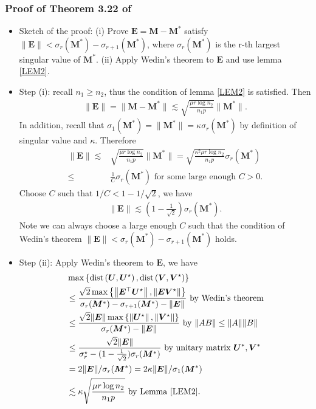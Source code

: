 \documentclass[override]{beamer} %
\newcommand{\bi}{\begin{itemize} \scriptsize} \newcommand{\ei}{\end{itemize}}
\theoremstyle{remark}
\newcommand{\bs}[1]{{\boldsymbol{#1}^*}}
\newcommand{\bb}[1]{{\boldsymbol {#1}}}
\begin{document}
\begin{frame}
\frametitle{Proof of Theorem 3.22 of \cite{Chen:2021}}
\bi
\item 
Sketch of the proof: 
(i) Prove $\bb E = \bb M - \bs M$ satisfy $\|\bb E\| < \sigma_r(\bs M) - \sigma_{r+1}(\bs M)$, where $\sigma_r(\bs M)$ is the r-th largest singular value of $\bs M$. (ii) Apply Wedin's theorem to $\bb E$ and use lemma \ref{LEM2}.
\item
Step (i): recall $n_1 \geq n_2$, thus the condition of lemma \ref{LEM2} is satisfied. Then 
\begin{align*}
    \|\bb E\| = \|\bb M  - \bs M\| 
    \lesssim \sqrt{\frac{\mu r \log n_2}{n_1 p }} \|\bs M\|.
\end{align*}
In addition, recall that $\sigma_1(\bs M) = \|\bs M\| = \kappa \sigma_r(\bs M)$ by definition of singular value and $\kappa$.
Therefore 
\begin{align*}
    \|\bb E\| 
    \lesssim & \sqrt{\frac{\mu r \log n_2}{n_1 p }} \|\bs M\|
    = \sqrt{\frac{ \kappa^2 \mu r \log n_2}{n_1 p }} \sigma_r(\bs M) \\
    \leq & \frac{1}{C} \sigma_r(\bs M) \text{ for some large enough $C>0$}.
\end{align*}
Choose $C$ such that $1/C < 1-1/\sqrt{2}$, we have 
\begin{align*}
    \|\bb E\| 
    \lesssim 
    (1-\frac{1}{\sqrt{2}}) \sigma_r(\bs M).
\end{align*}
Note we can always choose a large enough $C$ such that the condition of Wedin's theorem $\|\bb E\| < \sigma_r(\bs M) - \sigma_{r+1}(\bs M) $ holds.

\item
Step (ii): Apply Wedin's theorem to $\bb E$, we have 
\begin{align*}
& \max \left\{\operatorname{dist}\left(\boldsymbol{U}, \boldsymbol{U}^{\star}\right), \operatorname{dist}\left(\boldsymbol{V}, \boldsymbol{V}^{\star}\right)\right\} \\
& \leq \frac{\sqrt{2} \max \left\{\left\|\boldsymbol{E}^{\top} \boldsymbol{U}^{\star}\right\|,\left\|\boldsymbol{E} \boldsymbol{V}^{\star}\right\|\right\}}{\sigma_r(\bs M)-\sigma_{r+1}(\bs M)-\|\boldsymbol{E}\|} \text{ by  Wedin's theorem}\\
&  \leq \frac{\sqrt{2} \|\bb E\| \max \left\{\left\|\boldsymbol{U}^{\star}\right\|,\left\|\boldsymbol{V}^{\star}\right\|\right\}}{\sigma_r(\bs M)-\|\boldsymbol{E}\|} \text{ by } \|AB\|\leq \|A\|\|B\|\\
& \leq \frac{\sqrt{2} \|\bb E\|}{\sigma_r^{\star}-(1-\frac{1}{\sqrt{2}})\sigma_r(\bs M)} \text{ by unitary matrix $\bs U, \bs V$}\\
& = 2 \|\bb E\| / \sigma_r(\bs M) 
= 2\kappa \|\bb E\| /\sigma_1(\bs M)\\
& \lesssim \kappa \sqrt{\frac{\mu r\log n_2}{n_1 p}} \text{ by Lemma \ref{LEM2}}.
\end{align*}
\ei
\end{frame}
\end{document}
